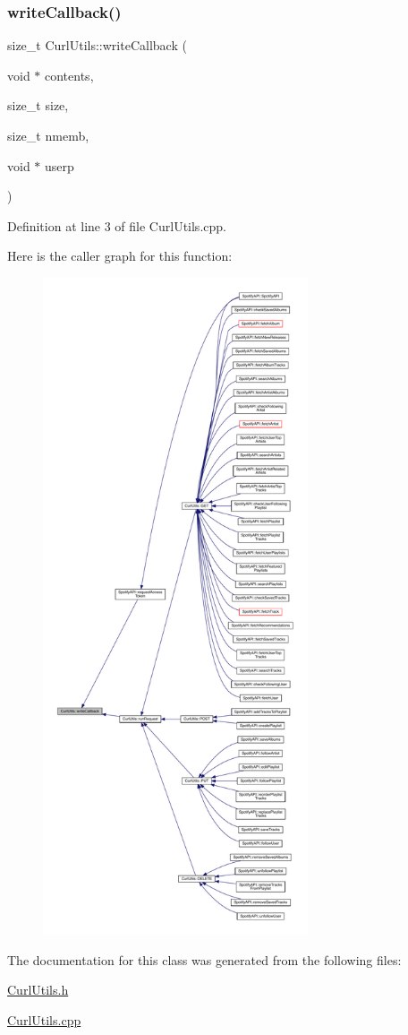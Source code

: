 \subsubsection{\texorpdfstring{write\+Callback()}{writeCallback()}}
{\footnotesize\ttfamily size\+\_\+t Curl\+Utils\+::write\+Callback (\begin{DoxyParamCaption}\item[{void $\ast$}]{contents,  }\item[{size\+\_\+t}]{size,  }\item[{size\+\_\+t}]{nmemb,  }\item[{void $\ast$}]{userp }\end{DoxyParamCaption})\hspace{0.3cm}{\ttfamily [static]}}



Definition at line 3 of file Curl\+Utils.\+cpp.

Here is the caller graph for this function\+:
\nopagebreak
\begin{figure}[H]
\begin{center}
\leavevmode
\includegraphics[height=550pt]{class_curl_utils_a1e068c580af8fc71663e220c6b2128c3_icgraph}
\end{center}
\end{figure}


The documentation for this class was generated from the following files\+:\begin{DoxyCompactItemize}
\item 
\mbox{\hyperlink{_curl_utils_8h}{Curl\+Utils.\+h}}\item 
\mbox{\hyperlink{_curl_utils_8cpp}{Curl\+Utils.\+cpp}}\end{DoxyCompactItemize}
